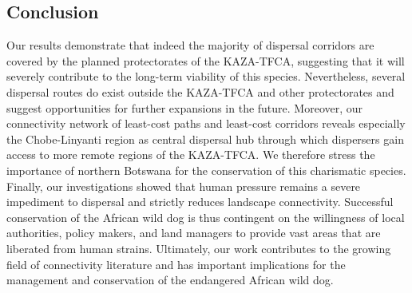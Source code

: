 \documentclass[abstract=on,10pt,a4paper,bibliography=totocnumbered]{scrartcl}
\begin{document}
\newpage
\subsection{Conclusion}
Our results demonstrate that indeed the majority of dispersal corridors are
covered by the planned protectorates of the KAZA-TFCA, suggesting that it will
severely contribute to the long-term viability of this species. Nevertheless,
several dispersal routes do exist outside the KAZA-TFCA and other protectorates
and suggest opportunities for further expansions in the future. Moreover, our
connectivity network of least-cost paths and least-cost corridors reveals
especially the Chobe-Linyanti region as central dispersal hub through which
dispersers gain access to more remote regions of the KAZA-TFCA. We therefore
stress the importance of northern Botswana for the conservation of this
charismatic species. Finally, our investigations showed that human pressure
remains a severe impediment to dispersal and strictly reduces landscape
connectivity. Successful conservation of the African wild dog is thus contingent
on the willingness of local authorities, policy makers, and land managers to
provide vast areas that are liberated from human strains. Ultimately, our work
contributes to the growing field of connectivity literature and has important
implications for the management and conservation of the endangered African wild
dog.

\newpage
\end{document}
